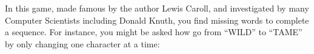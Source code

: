In this game, made famous by the author Lewis Caroll, and investigated by many Computer Scientists including Donald Knuth,
you find missing words to complete a sequence.
For instance, you might be asked how go from ``WILD'' to ``TAME''
by only changing one character at a time:
\begin{center}
\end{center}

